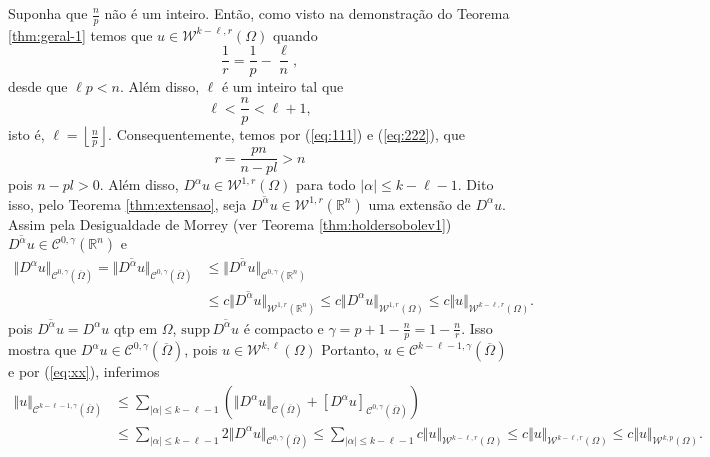 \documentclass[a4paper, 11pt]{book}
\theoremstyle{definition}
\newcommand{\bR}{\mathbb{R}}
\newcommand{\cC}{\mathcal{C}}
\newcommand{\cW}{\mathcal{W}}
\newcommand{\supp}{\mathrm{supp}\,}
\begin{document}
\begin{prf}
    Suponha que $\frac{n}{p}$ não é um inteiro. Então, como visto na demonstração do Teorema \ref{thm:geral-1} temos que $u \in \cW^{k-\ell,r}(\Omega)$ quando
    \begin{equation} \label{eq:111}
        \frac{1}{r} = \frac{1}{p} - \frac{\ell}{n},
    \end{equation}
    desde que $\ell p < n$. Além disso, $\ell$ é um inteiro tal que
    \begin{equation} \label{eq:222}
        \ell < \frac{n}{p} < \ell + 1,
    \end{equation}
    isto é, $\ell = \left\lfloor \frac{n}{p} \right\rfloor$.
    Consequentemente, temos por (\ref{eq:111}) e (\ref{eq:222}), que
    \begin{equation}
        r = \frac{pn}{n-pl} > n
    \end{equation}
    pois $n - pl > 0$. Além disso, $D^\alpha u \in \cW^{1,r}(\Omega)$ para todo $|\alpha| \leqslant k - \ell -1$. Dito isso, pelo Teorema \ref{thm:extensao}, seja $\overline{D^\alpha u} \in \cW^{1,r}(\bR^n)$ uma extensão de $D^\alpha u$.
    Assim pela Desigualdade de Morrey (ver Teorema \ref{thm:holdersobolev1}) $\overline{D^\alpha u} \in \cC^{0,\gamma}(\bR^n)$ e
    \begin{equation} \label{eq:xx}
        \begin{aligned}
            \Vert D^\alpha u \Vert_{\cC^{0,\gamma}(\overline\Omega)} = \Vert \overline{D^\alpha u} \Vert_{\cC^{0,\gamma}(\overline\Omega)} &\leqslant \Vert \overline{D^\alpha u} \Vert_{\cC^{0,\gamma}(\bR^n)} \\
            &\leqslant c \Vert \overline{D^\alpha u} \Vert_{\cW^{1,r}(\bR^n)}\leqslant c \Vert D^\alpha u \Vert_{\cW^{1,r}(\Omega)} \leqslant c \Vert u \Vert_{\cW^{k-\ell,r}(\Omega)}.
        \end{aligned}
    \end{equation}
    pois $\overline{D^\alpha u} = D^\alpha u$ qtp em $\Omega$, $\supp \overline{D^\alpha u}$ é compacto e $\gamma = p + 1 - \frac{n}{p} = 1 - \frac{n}{r}$.
    Isso mostra que $D^\alpha u \in \cC^{0,\gamma}(\overline\Omega)$, pois $u \in \cW^{k,\ell}(\Omega)$
    Portanto, $u \in \cC^{k-\ell-1,\gamma}(\overline\Omega)$ e por (\ref{eq:xx}), inferimos 
    \[
        \begin{aligned}
            \Vert u \Vert_{\cC^{k-\ell-1,\gamma}(\overline\Omega)} &\leqslant \sum_{|\alpha| \leqslant k - \ell - 1} \left( \Vert D^\alpha u \Vert_{\cC(\overline\Omega)} + [D^\alpha u]_{\cC^{0,\gamma}(\overline\Omega)} \right)\\
            &\leqslant \sum_{|\alpha| \leqslant k - \ell - 1} \!\!\!2 \Vert D^\alpha u  \Vert_{\cC^{0,\gamma}(\overline\Omega)} \leqslant \sum_{|\alpha| \leqslant k - \ell - 1} \!\!\!c \Vert u  \Vert_{\cW^{k-\ell,r}(\Omega)} \leqslant c \Vert u \Vert_{\cW^{k-\ell,r} (\Omega)} \leqslant c \Vert u \Vert_{\cW^{k,p}(\Omega)}.
        \end{aligned}
    \]


\end{prf}
\end{document}

